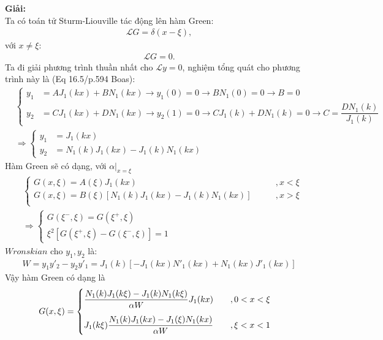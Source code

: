 \documentclass{report}
\newcommand{\f}[2]{\dfrac{#1}{#2}}
\newcommand{\atsmall}[2]{\big\rvert_{#1}^{#2}}
\begin{document}
\textbf{Giải:}\\
Ta có toán tử Sturm-Liouville tác động lên hàm Green:
\begin{align*}
	\mathcal{L} G = \delta(x-\xi),
\end{align*}
với $x\neq \xi$:
\begin{align*}
	\mathcal{L} G = 0.
\end{align*}
Ta đi giải phương trình thuần nhất cho $\mathcal{L} y = 0$, nghiệm tổng quát cho phương trình này là (Eq 16.5/p.594 Boas):
\begin{align*}
	 & \begin{cases}
		   y_{1} & = AJ_{1} (kx) + BN_{1} (kx) \rightarrow y_{1}(0) = 0 \rightarrow BN_{1}(0) = 0 \rightarrow B = 0                                     \\
		   y_{2} & = CJ_{1} (kx) + DN_{1} (kx) \rightarrow y_{2}(1) = 0 \rightarrow CJ_{1} (k) + DN_{1} (k) = 0 \rightarrow C = \f{DN_{1}(k)}{J_{1}(k)}
	   \end{cases} \\
	 & \Rightarrow
	\begin{cases}
		y_{1} & = J_{1}(kx)                               \\
		y_{2} & = N_{1}(k) J_{1}(kx) - J_{1}(k) N_{1}(kx)
	\end{cases}
\end{align*}
Hàm Green sẽ có dạng, với $\alpha \atsmall{x = \xi}{}$
\begin{align*}
	 & \begin{cases}
		   G(x,\xi) = A(\xi) J_{1}(kx) \quad \quad                                              & , x < \xi \\
		   G(x,\xi) = B(\xi) \left[ N_{1}(k) J_{1}(kx) - J_{1}(k) N_{1}(kx) \right] \quad \quad & , x > \xi \\
	   \end{cases} \\
	 & \Rightarrow
	\begin{cases}
		G(\xi^{-},\xi) = G(\xi^{+},\xi) \\
		\xi^2 \left[ G(\xi^{+},\xi) - G(\xi^{-},\xi) \right] = 1
	\end{cases}
\end{align*}
$Wronskian$ cho $y_1,y_2$ là:
\begin{align*}
	W = y_1 y'_2 - y_2 y'_1 = J_{1}(k) \left[ -J_{1}(kx) N'_{1}(kx) + N_{1}(kx) J'_{1}(kx) \right]
\end{align*}
Vậy hàm Green có dạng là
\begin{align*}
	G(x,\xi) =
	\begin{cases}
		\begin{aligned}
			\f{N_{1}(k) J_{1}(k\xi) - J_{1}(k) N_{1}(k\xi) }{\alpha W} J_{1}(kx) \quad \quad & , 0 < x < \xi \\
			\noalign{\vskip9pt}
			J_{1}(k\xi)\f{N_{1}(k) J_{1}(kx) - J_{1}(\xi) N_{1}(kx) }{\alpha W} \quad \quad  & , \xi < x < 1 \\
		\end{aligned}
	\end{cases}
\end{align*}
\end{document}
